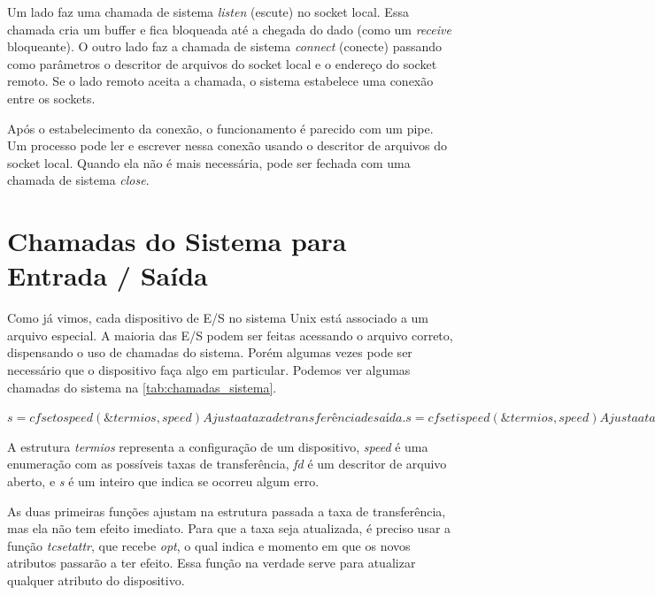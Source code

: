 Um lado faz uma chamada de sistema \emph{listen} (escute) no socket local. Essa chamada cria um buffer e fica bloqueada até a chegada do dado (como um \emph{receive} bloqueante). O outro lado faz a chamada de sistema \emph{connect} (conecte) passando como parâmetros o descritor de arquivos do socket local e o endereço do socket remoto. Se o lado remoto aceita a chamada, o sistema estabelece uma conexão entre os sockets.

Após o estabelecimento da conexão, o funcionamento é parecido com um pipe. Um processo pode ler e escrever nessa conexão usando o descritor de arquivos do socket local. Quando ela não é mais necessária, pode ser fechada com uma chamada de sistema \emph{close}.

\section{Chamadas do Sistema para Entrada / Saída}

Como já vimos, cada dispositivo de E/S no sistema Unix está associado a um arquivo especial. A maioria das E/S podem ser feitas acessando o arquivo correto, dispensando o uso de chamadas do sistema. Porém algumas vezes pode ser necessário que o dispositivo faça algo em particular. Podemos ver algumas chamadas do sistema na \ref{tab:chamadas_sistema}.

\begin{table}
\caption{Chamadas do Sistema UNIX de E/S}
\label{tab:chamadas_sistema}
$s = cfsetospeed(\&termios, speed)
Ajusta a taxa de transferência de saída.
s = cfsetispeed(\&termios, speed)
Ajusta a taxa de transferência de entrada.
speed = cfgetospeed(\&termios)
Obtém a taxa de transferência de saída.
speed = cfgetispeed(\&termios)
Obtém a taxa de transferência de entrada.
s = tcsetattr(fd, opt, \&termios)
Ajusta os atributos.
s = tcgetattr(fd, \&termios)
Obtém os atributos.$
\end{table}

A estrutura \emph{termios} representa a configuração de um dispositivo, \emph{speed} é uma enumeração com as possíveis taxas de transferência, \emph{fd} é um descritor de arquivo aberto, e \emph{s} é um inteiro que indica se ocorreu algum erro.

As duas primeiras funções ajustam na estrutura passada a taxa de transferência, mas ela não tem efeito imediato. Para que a taxa seja atualizada, é preciso usar a função \emph{tcsetattr}, que recebe \emph{opt}, o qual indica e momento em que os novos atributos passarão a ter efeito. Essa função na verdade serve para atualizar qualquer atributo do dispositivo.

